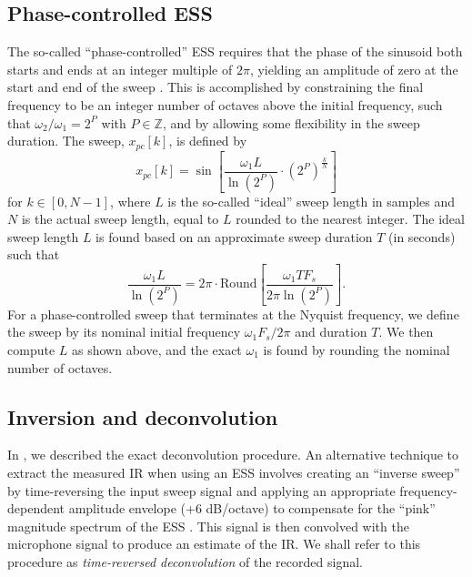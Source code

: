 \subsection{Phase-controlled ESS}\label{sec:A5_Impulse_Response:PC-ESS}
The so-called ``phase-controlled'' ESS requires that the phase of the sinusoid both starts and ends at an integer multiple of $2 \pi$, yielding an amplitude of zero at the start and end of the sweep \citep{VetterdiRosario2011}.
This is accomplished by constraining the final frequency to be an integer number of octaves above the initial frequency, such that $\omega_2/\omega_1 = 2^P$ with $P \in \mathbb{Z}$, and by allowing some flexibility in the sweep duration.
The sweep, $x_{pc}[k]$, is defined by \citep{VetterdiRosario2011}
\begin{equation}\label{eq:A5_Impulse_Response:PC-ESS}
x_{pc}[k] = \sin \left[ \frac{ \omega_1 L}{\ln \left( 2^P \right)} \cdot \left( 2^P \right)^{\frac{k}{N}} \right]
\end{equation}
for $k \in[0,N-1]$, where $L$ is the so-called ``ideal'' sweep length in samples and $N$ is the actual sweep length, equal to $L$ rounded to the nearest integer.
The ideal sweep length $L$ is found based on an approximate sweep duration $T$ (in seconds) such that 
\begin{equation*}
\frac{\omega_1 L}{\ln \left( 2^P \right)} = 2 \pi \cdot \textrm{Round} \left[ \frac{\omega_1 T F_s}{2 \pi \ln \left( 2^P \right)} \right].
\end{equation*}
For a phase-controlled sweep that terminates at the Nyquist frequency, we define the sweep by its nominal initial frequency $\omega_1 F_s/2 \pi$ and duration $T$.
We then compute $L$ as shown above, and the exact $\omega_1$ is found by rounding the nominal number of octaves.

\subsection{Inversion and deconvolution}
In , we described the exact deconvolution procedure.
An alternative technique to extract the measured IR when using an ESS involves creating an ``inverse sweep'' by time-reversing the input sweep signal and applying an appropriate frequency-dependent amplitude envelope (+6 dB/octave) to compensate for the ``pink'' magnitude spectrum of the ESS \citep{Farina2007a,VetterdiRosario2011}.
This signal is then convolved with the microphone signal to produce an estimate of the IR.
We shall refer to this procedure as \textit{time-reversed deconvolution} of the recorded signal.

